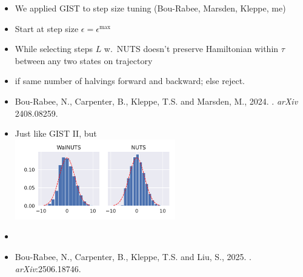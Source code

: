 \documentclass[10pt]{report}
\begin{document}
\begin{itemize}
\item We applied GIST to step size tuning (Bou-Rabee, Marsden, Kleppe, me)
\item Start at step size $\epsilon = \epsilon^\textrm{max}$
\item While selecting steps $L$ w.\ NUTS doesn't preserve Hamiltonian within $\tau$ between any two states on trajectory
  \item {} if same number of halvings forward and backward; else reject.
    \vspace*{-12pt}
  \vfill
  \item {\small Bou-Rabee, N., Carpenter, B., Kleppe, T.S. and Marsden, M., 2024. . \textit{arXiv} 2408.08259.}
\end{itemize}

\begin{itemize}
\item Just like GIST II, but  \\[4pt]
  \includegraphics[width=0.55\textwidth]{img/funnel_hist.pdf}
  \vspace*{-4pt}
\item {\small {}}
\item {\small Bou-Rabee, N., Carpenter, B., Kleppe, T.S. and Liu, S., 2025. . \textit{arXiv}:2506.18746.}
\end{itemize}
\end{document}
